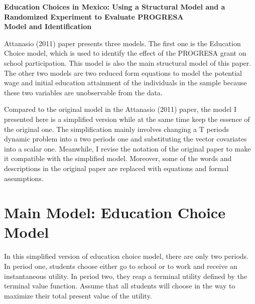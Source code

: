 \documentclass{handoutForSolutions}
\begin{document}
\begin{center}
{ \normalfont \Large \textbf{Education Choices in Mexico:
Using a Structural Model and a Randomized Experiment to Evaluate PROGRESA} }\\
\vspace{3mm}
{ \large \textbf{Model and Identification} }
\end{center}


Attanasio (2011) paper presents three models. The first one is the Education Choice model, which is used to identify the effect of the PROGRESA grant on school participation. This model is also the main structural model of this paper. The other two models are two reduced form equations to model the potential wage and initial education attainment of the individuals in the sample because these two variables are unobservable from the data.

Compared to the original model in the Attanasio (2011) paper, the model I presented here is a simplified version while at the same time keep the essence of the original one. The simplification mainly involves changing a T periods dynamic problem into a two periods one and substituting the vector covariates into a scalar one. Meanwhile, I revise the notation of the original paper to make it compatible with the simplified model. Moreover, some of the words and descriptions in the original paper are replaced with equations and formal assumptions. 
\section{Main Model: Education Choice Model}
In this simplified version of education choice model, there are only two periods. In period one, students choose either go to school or to work and receive an instantaneous utility. In period two, they reap a terminal utility defined by the terminal value function. Assume that all students will choose in the way to maximize their total present value of the utility.
\end{document}

